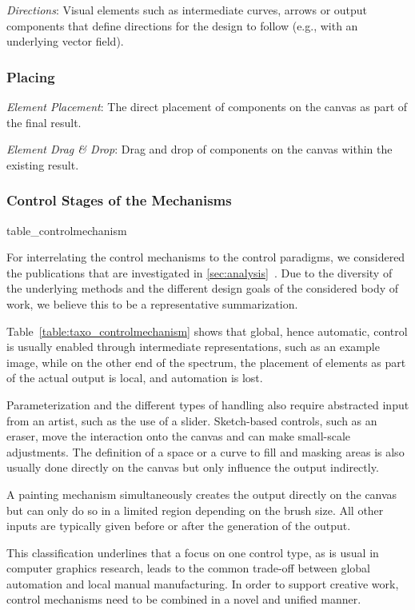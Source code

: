 \textit{Directions}: Visual elements such as intermediate curves, arrows or output components that define directions for the design to follow (e.g., with an underlying vector field).


\subsubsection{Placing}


\textit{Element Placement}: The direct placement of components on the canvas as part of the final result.

\textit{Element Drag \& Drop}: Drag and drop of components on the canvas within the existing result.


\subsubsection{Control Stages of the Mechanisms}
\label{subsec:taxo_control_mechanism}

{table_controlmechanism}

For interrelating the control mechanisms to the control paradigms, we considered the publications that are investigated in \cref{sec:analysis}~. Due to the diversity of the underlying methods and the different design goals of the considered body of work, we believe this to be a representative summarization.


Table~\ref{table:taxo_controlmechanism} shows that global, hence automatic, control is usually enabled through intermediate representations, such as an example image, while on the other end of the spectrum, the placement of elements as part of the actual output is local, and automation is lost.

Parameterization and the different types of handling also require abstracted input from an artist, such as the use of a slider. Sketch-based controls, such as an eraser, move the interaction onto the canvas and can make small-scale adjustments. The definition of a space or a curve to fill and masking areas is also usually done directly on the canvas but only influence the output indirectly.

A painting mechanism simultaneously creates the output directly on the canvas but can only do so in a limited region depending on the brush size. All other inputs are typically given before or after the generation of the output.

This classification underlines that a focus on one control type, as is usual in computer graphics research, leads to the common trade-off between global automation and local manual manufacturing. In order to support creative work, control mechanisms need to be combined in a novel and unified manner.


